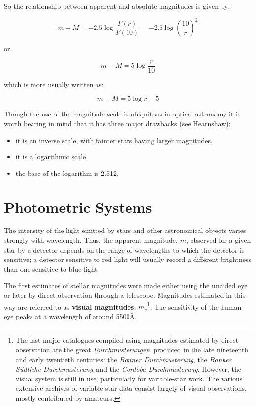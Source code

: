 \documentclass[twoside,11pt]{article}
\newcommand{\xlabel}[1]{}
\begin{document}
So the relationship between apparent and absolute magnitudes is given
by:

\begin{equation}
m-M = -2.5 \log \frac{F(r)}{F(10)} = -2.5 \log \left( \frac{10}{r}
\right)^2
\end{equation}

or

\begin{equation}
m-M = 5 \log \frac{r}{10}
\end{equation}

which is more usually written as:

\begin{equation}
m-M = 5 \log r  - 5
\end{equation}

Though the use of the magnitude scale is ubiquitous in optical astronomy
it is worth bearing in mind that it has three major drawbacks (see
Hearnshaw\cite{HEARNSHAW91}):

\begin{itemize}

  \item it is an inverse scale, with fainter stars having larger
   magnitudes,

  \item it is a logarithmic scale,

  \item the base of the logarithm is 2.512.

\end{itemize}


\section{\xlabel{PHOTOSYS}\label{PHOTOSYS}Photometric Systems}

The intensity of the light emitted by stars and other astronomical
objects varies strongly with wavelength.  Thus, the apparent magnitude,
$m$, observed for a given star by a detector depends on the range of
wavelengths to which the detector is sensitive; a detector sensitive
to red light will usually record a different brightness than one
sensitive to blue light.

The first estimates of stellar magnitudes were made either using the
unaided eye or later by direct observation through a telescope.
Magnitudes estimated in this way are referred to as {\bf visual
magnitudes}, $m_{v}$\footnote{The last major catalogues compiled using
magnitudes estimated by direct observation are the great {\it
Durchmusterungen}\, produced in the late nineteenth and early twentieth
centuries: the {\it Bonner Durchmusterung}, the {\it Bonner S\"{u}dliche
Durchmusterung}\, and the {\it Cordoba Durchmusterung}.  However, the
visual system is still in use, particularly for variable-star work.
The various extensive archives of variable-star data consist largely of
visual observations, mostly contributed by amateurs.}.  The sensitivity
of the human eye peaks at a wavelength of around 5500\AA.
\end{document}

